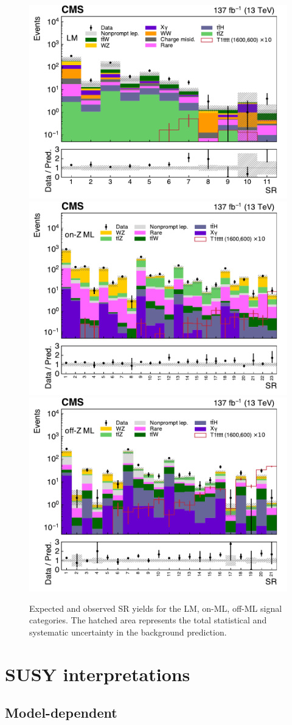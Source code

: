 \begin{figure}[!hbtp]
\centering
\includegraphics[width=.50\textwidth]{figs/ssp/SRLM_TOTAL.pdf}
\includegraphics[width=.50\textwidth]{figs/ssp/SRMLONZ_TOTAL.pdf}
\includegraphics[width=.50\textwidth]{figs/ssp/SRMLOFFZ_TOTAL.pdf}
\\
\caption{Expected and observed SR yields for the LM, on-\PZ ML, off-\PZ ML signal categories. 
The hatched area represents the total statistical and systematic uncertainty in the background prediction.
}
\label{fig:SRrun2b}
\end{figure}


                               
\FloatBarrier

\section{SUSY interpretations}
\label{sec:ssinterpretations}

\subsection{Model-dependent}


